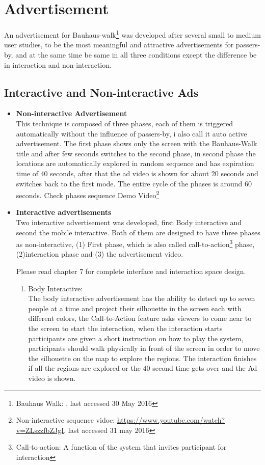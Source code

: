 \section{Advertisement}
An advertisement for Bauhaus-walk\footnote{Bauhaus Walk: \url{}, last accessed 30 May 2016} was developed after several small to medium user studies, to be the most meaningful and attractive advertisements for passers-by, and at the same time be same in all three conditions except the difference be in interaction and non-interaction.




\subsection{Interactive and Non-interactive Ads}

\begin{itemize}
\item \textbf{Non-interactive Advertisement} \\
This technique is composed of three phases, each of them is triggered automatically without the influence of passers-by, i also call it auto active advertisement. The first phase shows only the screen with the Bauhaus-Walk title and after few seconds switches to the second phase, in second phase the locations are automatically explored in random sequence and has expiration time of 40 seconds, after that the ad video is shown for about 20 seconds and switches back to the first mode. The entire cycle of the phases is around 60 seconds. Check phases sequence Demo Video\footnote{Non-interactive sequence vidoe: \url{https://www.youtube.com/watch?v=ZLszzfbZJgI}, last accessed 31 may 2016} \\

\item \textbf{Interactive advertisements} \\
Two interactive advertisement was developed, first Body interactive and second the mobile interactive. Both of them are designed to have three phases as non-interactive, (1) First phase, which is also called call-to-action\footnote{Call-to-action: A function of the system that invites participant for interaction} phase, (2)interaction phase and (3) the advertisement video. 
 
Please read chapter 7 for complete interface and interaction space design.

\begin{enumerate}

\item Body Interactive: \\
The body interactive advertisement has the ability to detect up to seven people at a time and project their silhouette in the screen each with different colors, the Call-to-Action feature asks viewers to come near to the screen to start the interaction, when the interaction starts participants are given a short instruction on how to play the system, participants should walk physically in front of the screen in order to move the silhouette on the map to explore the regions. The interaction finishes if all the regions are explored or the 40 second time gets over and the Ad video is shown.



\end{enumerate}
\end{itemize}
